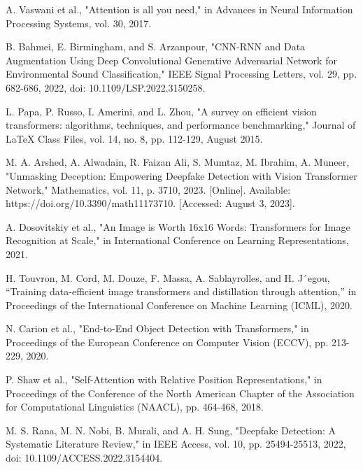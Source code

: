 \begin{thebibliography}{99}
        \item\label{ref9} A. Vaswani et al., "Attention is all you need," in Advances in Neural Information Processing Systems, vol. 30, 2017.
        
        \item\label{ref10} B. Bahmei, E. Birmingham, and S. Arzanpour, "CNN-RNN and Data Augmentation Using Deep Convolutional Generative Adversarial Network for Environmental Sound Classification," IEEE Signal Processing Letters, vol. 29, pp. 682-686, 2022, doi: 10.1109/LSP.2022.3150258.
        
        \item\label{ref11} L. Papa, P. Russo, I. Amerini, and L. Zhou, "A survey on efficient vision transformers: algorithms, techniques, and performance benchmarking," Journal of LaTeX Class Files, vol. 14, no. 8, pp. 112-129, August 2015.
        
        \item\label{ref12} M. A. Arshed, A. Alwadain, R. Faizan Ali, S. Mumtaz, M. Ibrahim, A. Muneer, "Unmasking Deception: Empowering Deepfake Detection with Vision Transformer Network," Mathematics, vol. 11, p. 3710, 2023. [Online]. Available: https://doi.org/10.3390/math11173710. [Accessed: August 3, 2023].
        
        \item\label{ref13} A. Dosovitskiy et al., "An Image is Worth 16x16 Words: Transformers for Image Recognition at Scale," in International Conference on Learning Representations, 2021.
        
        \item\label{ref14} H. Touvron, M. Cord, M. Douze, F. Massa, A. Sablayrolles, and H. J´egou, “Training data-efficient image transformers and distillation through attention,” in Proceedings of the International Conference on Machine Learning (ICML), 2020.
        
        \item\label{ref15} N. Carion et al., "End-to-End Object Detection with Transformers," in Proceedings of the European Conference on Computer Vision (ECCV), pp. 213-229, 2020.
        
        \item\label{ref16} P. Shaw et al., "Self-Attention with Relative Position Representations," in Proceedings of the Conference of the North American Chapter of the Association for Computational Linguistics (NAACL), pp. 464-468, 2018.
        
        \item\label{ref17} M. S. Rana, M. N. Nobi, B. Murali, and A. H. Sung, "Deepfake Detection: A Systematic Literature Review," in IEEE Access, vol. 10, pp. 25494-25513, 2022, doi: 10.1109/ACCESS.2022.3154404.


\end{thebibliography}

